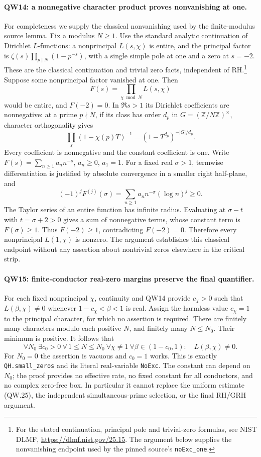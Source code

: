 \paragraph{QW14: a nonnegative character product proves nonvanishing at one.}
For completeness we supply the classical nonvanishing used by the
finite-modulus source lemma. Fix a modulus $N\ge1$. Use the standard
analytic continuation of Dirichlet $L$-functions: a nonprincipal
$L(s,\chi)$ is entire, and the principal factor is
$\zeta(s)\prod_{p\mid N}(1-p^{-s})$, with a single simple pole at one
and a zero at $s=-2$. These are the classical continuation and trivial
zero facts, independent of RH.\footnote{For the stated continuation,
principal pole and trivial-zero formulas, see NIST DLMF,
\url{https://dlmf.nist.gov/25.15}. The argument below supplies the
nonvanishing endpoint used by the pinned source's \texttt{noExc\_one}.}
Suppose some nonprincipal factor vanished at one. Then
\[
                  F(s)=\prod_{\chi\bmod N}L(s,\chi)
\]
would be entire, and $F(-2)=0$. In $\Re s>1$ its Dirichlet coefficients
are nonnegative: at a prime $p\nmid N$, if its class has order $d_p$
in $G=(\mathbb Z/N\mathbb Z)^\times$, character orthogonality gives
\[
 \prod_\chi(1-\chi(p)T)^{-1}=(1-T^{d_p})^{-|G|/d_p}.
\]
Every coefficient is nonnegative and the constant coefficient is one.
Write $F(s)=\sum_{n\ge1}a_n n^{-s}$, $a_n\ge0$, $a_1=1$.
For a fixed real $\sigma>1$, termwise differentiation is justified by
absolute convergence in a smaller right half-plane, and
\[
 (-1)^jF^{(j)}(\sigma)=\sum_{n\ge1}a_n n^{-\sigma}(\log n)^j\ge0.
\]
The Taylor series of an entire function has infinite radius. Evaluating
at $\sigma-t$ with $t=\sigma+2>0$ gives a sum of nonnegative terms,
whose constant term is $F(\sigma)\ge1$. Thus $F(-2)\ge1$, contradicting
$F(-2)=0$. Therefore every nonprincipal $L(1,\chi)$ is nonzero.
The argument establishes this classical endpoint without any assertion
about nontrivial zeros elsewhere in the critical strip.

\paragraph{QW15: finite-conductor real-zero margins preserve the final quantifier.}
For each fixed nonprincipal $\chi$, continuity and QW14 provide
$c_\chi>0$ such that $L(\beta,\chi)\ne0$ whenever
$1-c_\chi<\beta<1$ is real. Assign the harmless value $c_\chi=1$
to the principal character, for which no assertion is required.
There are finitely many characters modulo each positive $N$, and
finitely many $N\le N_0$. Their minimum is positive. It follows that
\[
 \forall N_0\ \exists c_0>0\ \forall\,1\le N\le N_0\
 \forall\chi\ne1\ \forall\beta\in(1-c_0,1):\quad
                              L(\beta,\chi)\ne0.               \tag{QW.33}
\]
For $N_0=0$ the assertion is vacuous and $c_0=1$ works. This is exactly
\texttt{QH.small\_zeros} and its literal real-variable \texttt{NoExc}.
The constant can depend on $N_0$; the proof provides no effective rate,
no fixed constant for all conductors, and no complex zero-free box.
In particular it cannot replace the uniform estimate (QW.25), the
independent simultaneous-prime selection, or the final RH/GRH argument.
